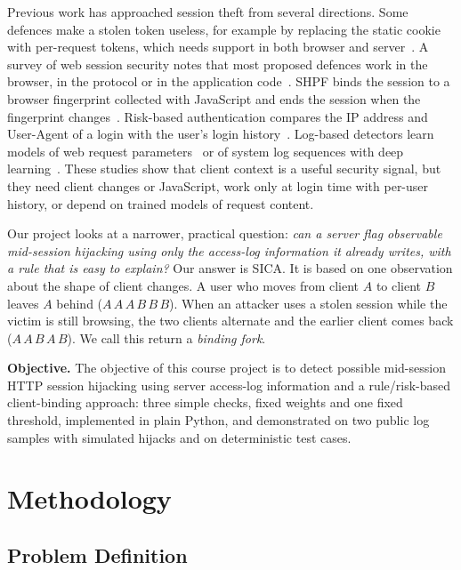 \documentclass[conference]{IEEEtran}
\begin{document}
Previous work has approached session theft from several directions. Some
defences make a stolen token useless, for example by replacing the static cookie
with per-request tokens, which needs support in both browser and
server~\cite{dacosta2012onetime}. A survey of web session security notes that
most proposed defences work in the browser, in the protocol or in the
application code~\cite{calzavara2017surviving}. SHPF binds the session to a
browser fingerprint collected with JavaScript and ends the session when the
fingerprint changes~\cite{unger2013shpf}. Risk-based authentication compares the
IP address and User-Agent of a login with the user's login
history~\cite{freeman2016whoareyou}. Log-based detectors learn models of web
request parameters~\cite{kruegel2003anomaly} or of system log sequences with deep
learning~\cite{du2017deeplog}. These studies show that client context is a
useful security signal, but they need client changes or JavaScript, work only at
login time with per-user history, or depend on trained models of request
content.

Our project looks at a narrower, practical question: \emph{can a server flag
observable mid-session hijacking using only the access-log information it
already writes, with a rule that is easy to explain?} Our answer is SICA. It is
based on one observation about the shape of client changes. A user who moves
from client $A$ to client $B$ leaves $A$ behind ($A\,A\,A\,B\,B\,B$). When an
attacker uses a stolen session while the victim is still browsing, the two
clients alternate and the earlier client comes back ($A\,A\,B\,A\,B$). We call
this return a \emph{binding fork}.

\textbf{Objective.} The objective of this course project is to detect possible
mid-session HTTP session hijacking using server access-log information and a
rule/risk-based client-binding approach: three simple checks, fixed weights and
one fixed threshold, implemented in plain Python, and demonstrated on two public
log samples with simulated hijacks and on deterministic test cases.

\section{Methodology}

\subsection{Problem Definition}
\end{document}
